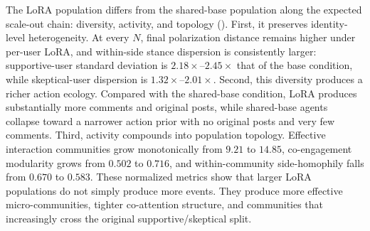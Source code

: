 \documentclass{llmxive}
\begin{document}
The LoRA population differs from the shared-base population along the expected scale-out chain: diversity, activity, and topology (). First, it preserves identity-level heterogeneity. At every \(N\), final polarization distance remains higher under per-user LoRA, and within-side stance dispersion is consistently larger: supportive-user standard deviation is \(2.18\times\)--\(2.45\times\) that of the base condition, while skeptical-user dispersion is \(1.32\times\)--\(2.01\times\). Second, this diversity produces a richer action ecology. Compared with the shared-base condition, LoRA produces substantially more comments and original posts, while shared-base agents collapse toward a narrower action prior with no original posts and very few comments. Third, activity compounds into population topology. Effective interaction communities grow monotonically from \(9.21\) to \(14.85\), co-engagement modularity grows from \(0.502\) to \(0.716\), and within-community side-homophily falls from \(0.670\) to \(0.583\). These normalized metrics show that larger LoRA populations do not simply produce more events. They produce more effective micro-communities, tighter co-attention structure, and communities that increasingly cross the original supportive/skeptical split.
\end{document}
